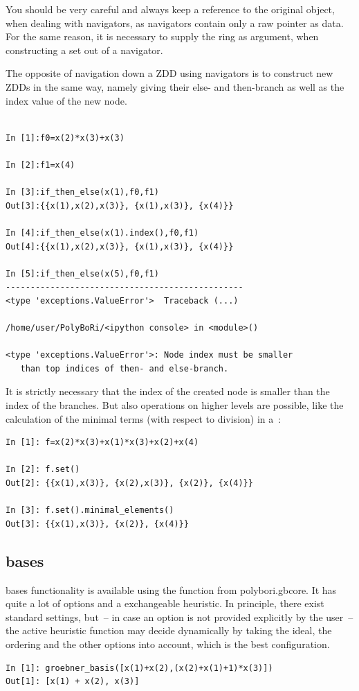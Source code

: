 You should be very careful and always keep a reference to the original object, when dealing with navigators, as navigators contain only a raw pointer as data.
For the same reason, it is necessary to supply the ring as argument, when constructing a set out of a navigator.

The opposite of navigation down a ZDD using navigators is to construct new ZDDs in the same way, namely giving their else- and then-branch as well as the index value of the new node.

\begin{lstlisting}
    
In [1]:f0=x(2)*x(3)+x(3)

In [2]:f1=x(4)

In [3]:if_then_else(x(1),f0,f1)
Out[3]:{{x(1),x(2),x(3)}, {x(1),x(3)}, {x(4)}}

In [4]:if_then_else(x(1).index(),f0,f1)
Out[4]:{{x(1),x(2),x(3)}, {x(1),x(3)}, {x(4)}}

In [5]:if_then_else(x(5),f0,f1)
------------------------------------------------
<type 'exceptions.ValueError'>  Traceback (...) 

/home/user/PolyBoRi/<ipython console> in <module>()

<type 'exceptions.ValueError'>: Node index must be smaller
   than top indices of then- and else-branch.
\end{lstlisting}

It is strictly necessary that the index of the created node is smaller than the index of the branches.
%
%
But also operations on higher levels are possible, like the calculation of the minimal terms (with respect to division) in a~:
\begin{lstlisting}
In [1]: f=x(2)*x(3)+x(1)*x(3)+x(2)+x(4)

In [2]: f.set()
Out[2]: {{x(1),x(3)}, {x(2),x(3)}, {x(2)}, {x(4)}}

In [3]: f.set().minimal_elements()
Out[3]: {{x(1),x(3)}, {x(2)}, {x(4)}}
\end{lstlisting}
\subsection{\Groebner bases}
\Groebner bases functionality is available using the function  from polybori.gbcore.
It has quite a lot of options and a exchangeable heuristic.
In principle, there exist  standard settings, but~-- in case an option is not
provided explicitly by the user~-- the active heuristic function
may decide dynamically by taking the ideal, the ordering and the other options into account, which is the best configuration.
\begin{lstlisting}
In [1]: groebner_basis([x(1)+x(2),(x(2)+x(1)+1)*x(3)])
Out[1]: [x(1) + x(2), x(3)]
\end{lstlisting}


